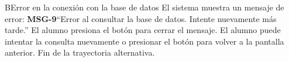 \begin{UCtrayectoriaA}{B}{Error en la conexión con la base de datos}
	\UCpaso El sistema muestra un mensaje de error: {\bf MSG-9}{``Error al consultar la base de datos. Intente nuevamente más tarde.''}
	\UCpaso[\UCactor] El alumno presiona el botón  para cerrar el mensaje.
	\UCpaso[\UCactor] El alumno puede intentar la consulta nuevamente o presionar el botón  para volver a la pantalla anterior.
	\UCpaso Fin de la trayectoria alternativa.
\end{UCtrayectoriaA}

